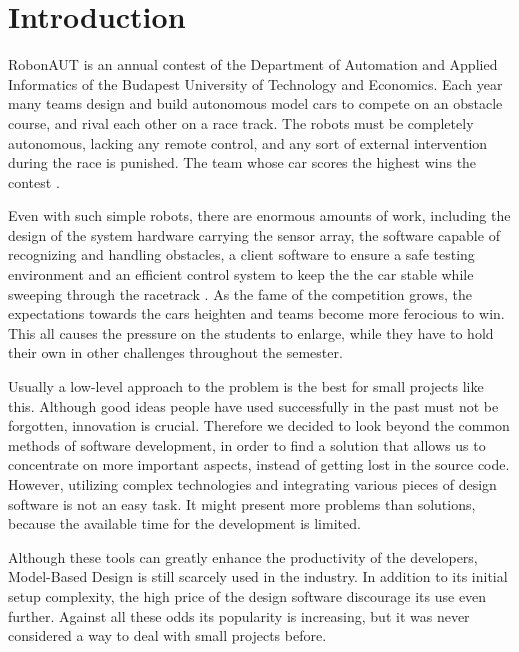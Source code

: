 \section{Introduction}
\label{sec:Introduction}


RobonAUT is an annual contest of the Department of Automation and Applied Informatics of the Budapest University of Technology and Economics. Each year many teams design and build autonomous model cars to compete on an obstacle course, and rival each other on a race track. The robots must be completely autonomous, lacking any remote control, and any sort of external intervention during the race is punished. The team whose car scores the highest wins the contest \cite{rules}.


Even with such simple robots, there are enormous amounts of work, including the design of the system hardware carrying the sensor array, the software capable of recognizing and handling obstacles, a client software to ensure a safe testing environment and an efficient control system to keep the the car stable while sweeping through the racetrack \cite{robonauttdk}. As the fame of the competition grows, the expectations towards the cars heighten and teams become more ferocious to win. This all causes the pressure on the students to enlarge, while they have to hold their own in other challenges throughout the semester.


Usually a low-level approach to the problem is the best for small projects like this. Although good ideas people have used successfully in the past must not be forgotten, innovation is crucial. Therefore we decided to look beyond the common methods of software development, in order to find a solution that allows us to concentrate on more important aspects, instead of getting lost in the source code. However, utilizing complex technologies and integrating various pieces of design software is not an easy task. It might present more problems than solutions, because the available time for the development is limited.


Although these tools can greatly enhance the productivity of the developers, Model-Based Design is still scarcely used in the industry. In addition to its initial setup complexity, the high price of the design software discourage its use even further. Against all these odds its popularity is increasing, but it was never considered a way to deal with small projects before.

